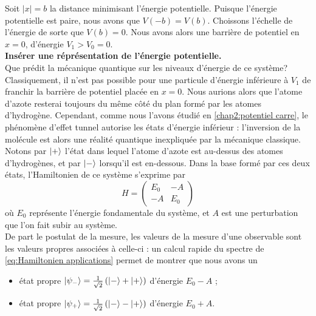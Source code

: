 \documentclass[../notesdecours.tex]{subfiles}
\begin{document}
Soit $|x| = b$ la distance minimisant l'énergie potentielle. Puisque l'énergie potentielle est paire, nous avons que $V(-b) = V(b)$. Choissons l'échelle de l'énergie de sorte que $V(b) = 0$. Nous avons alors une barrière de potentiel en $x = 0$, d'énergie $V_1 > V_0 = 0$.\\

\color{red} \textbf{Insérer une réprésentation de l'énergie potentielle.}\color{black}\\

Que prédit la mécanique quantique sur les niveaux d'énergie de ce système? Classiquement, il n'est pas possible pour une particule d'énergie inférieure à $V_1$ de franchir la barrière de potentiel placée en $x=0$. Nous aurions alors que l'atome d'azote resterai toujours du même côté du plan formé par les atomes d'hydrogène. Cependant, comme nous l'avons étudié en \ref{chap2:potentiel carre}, le phénomène d'effet tunnel autorise les états d'énergie inférieur : l'inversion de la molécule est alors une réalité quantique inexpliquée par la mécanique classique.\\

Notons par $\ket{+}$ l'état dans lequel l'atome d'azote est au-dessus des atomes d'hydrogènes, et par $\ket{-}$ lorsqu'il est en-dessous. Dans la base formé par ces deux états, l'Hamiltonien de ce système s'exprime par
\begin{equation}
    H = 
    \begin{pmatrix}
        E_0 & -A\\
        -A & E_0
    \end{pmatrix}\label{eq:Hamiltonien applications}
\end{equation}
où $E_0$ représente l'énergie fondamentale du système, et $A$ est une perturbation que l'on fait subir au système.\\

De part le postulat de la mesure, les valeurs de la mesure d'une observable sont les valeurs propres associées à celle-ci : un calcul rapide du spectre de \eqref{eq:Hamiltonien applications} permet de montrer que nous avons un
\begin{itemize}
    \item état propre $\ket{\psi_-} = \frac{1}{\sqrt{2}}\left(\ket{-}+\ket{+}\right)$ d'énergie $E_0-A$ ;
    \item état propre $\ket{\psi_+} = \frac{1}{\sqrt{2}}\left(\ket{-}-\ket{+}\right)$ d'énergie $E_0+A$.
\end{itemize}
\end{document}
